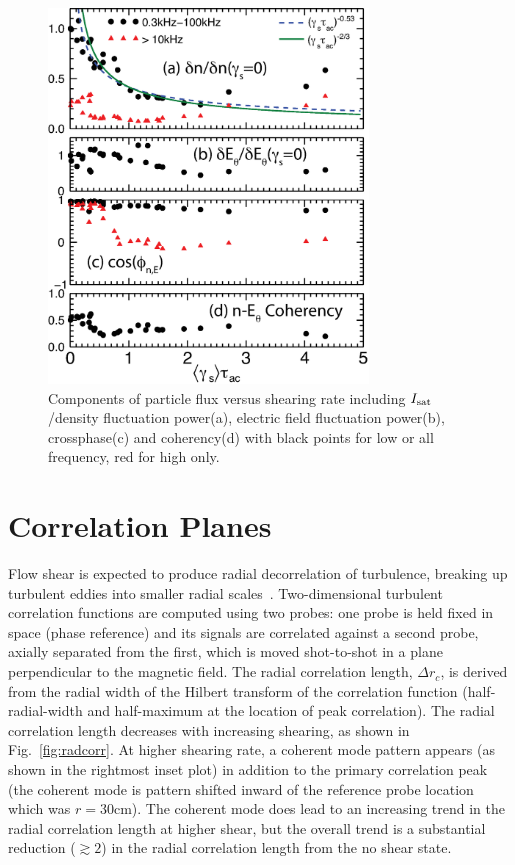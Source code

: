 \documentclass[aip,pop,amsmath,amssymb,reprint,superscriptaddress]{revtex4-1} %
\begin{document}
\begin{figure}[!htbp]
\centerline{
\includegraphics[width=8.5cm]{figure5.eps}}
\caption{\label{fig:fluxcomps} Components of particle flux versus shearing rate including $I_{\rm sat}$/density fluctuation power(a), electric field fluctuation power(b), crossphase(c) and coherency(d) with black points for low or all frequency, red for high only.}
\end{figure}

\section{Correlation Planes}

Flow shear is expected to produce radial decorrelation of turbulence,
breaking up turbulent eddies into smaller radial scales~\cite{biglari90}.
Two-dimensional turbulent correlation functions are computed using
two probes: one probe is held fixed in space (phase reference) and
its signals are correlated against a second probe, axially separated
from the first, which is moved shot-to-shot in a plane perpendicular
to the magnetic field.  The radial correlation length, $\Delta r_c$,
is derived from the radial width of the Hilbert transform of the
correlation function (half-radial-width and half-maximum at the
location of peak correlation).  The radial correlation length 
decreases with increasing shearing, as shown in
Fig.~\ref{fig:radcorr}.  At higher shearing rate, a coherent mode
pattern appears (as shown in the rightmost inset plot) in addition to
the primary correlation peak (the coherent mode is
pattern shifted inward of the reference probe location which was $r=30$cm).  The coherent
mode does lead to an increasing trend in the radial correlation length
at higher shear, but the overall trend is a substantial reduction
($\gtrsim 2$) in the radial correlation length from the no shear state.
\end{document}
